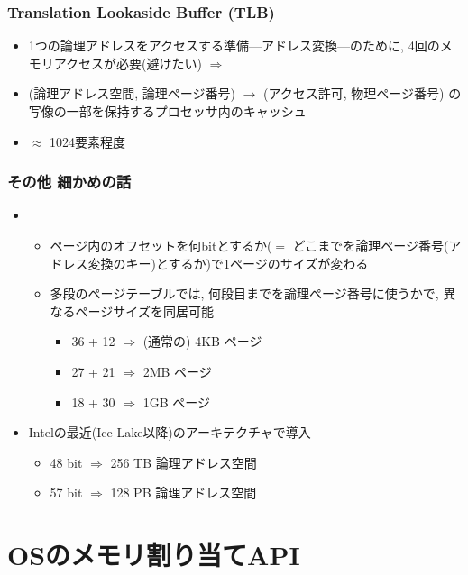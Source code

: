 \documentclass[12pt,dvipdfmx]{beamer}
\begin{document}
\begin{frame}
  \frametitle{Translation Lookaside Buffer (TLB)}
  \begin{itemize}
  \item 1つの論理アドレスをアクセスする準備---アドレス変換---のために,
    4回のメモリアクセスが必要(避けたい)
    $\Rightarrow$ 
  \item
    (論理アドレス空間, 論理ページ番号) $\rightarrow$ (アクセス許可, 物理ページ番号)
    の写像の一部を保持するプロセッサ内のキャッシュ
  \item $\approx$ 1024要素程度
  \end{itemize}
\end{frame}

\begin{frame}
  \frametitle{その他 細かめの話}
  \begin{itemize}
  \item {}
    \begin{itemize}
    \item ページ内のオフセットを何bitとするか($=$ どこまでを論理ページ番号(アドレス変換のキー)とするか)で1ページのサイズが変わる
    \item 多段のページテーブルでは, 何段目までを論理ページ番号に使うかで,
      異なるページサイズを同居可能
      \begin{itemize}
      \item 36 + 12 $\Rightarrow$ (通常の) 4KB ページ
      \item 27 + 21 $\Rightarrow$ 2MB ページ
      \item 18 + 30 $\Rightarrow$ 1GB ページ
      \end{itemize}
    \end{itemize}
  \item {}
    Intelの最近(Ice Lake以降)のアーキテクチャで導入
    \begin{itemize}
    \item 48 bit $\Rightarrow$ 256 TB 論理アドレス空間
    \item 57 bit $\Rightarrow$ 128 PB 論理アドレス空間
    \end{itemize}
  \end{itemize}
\end{frame}

\section{OSのメモリ割り当てAPI}
\end{document}
